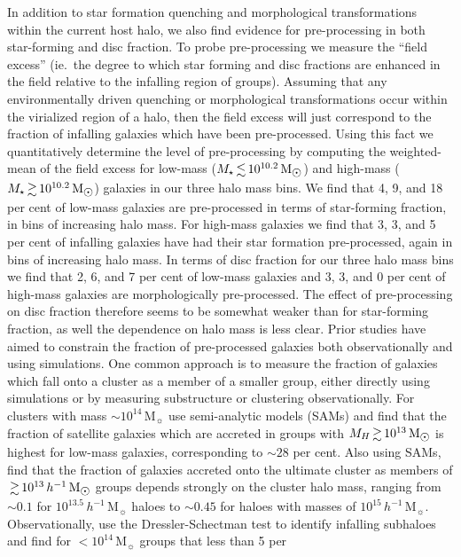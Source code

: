 \documentclass[a4paper,fleqn,usenatbib]{mnras}
\newcommand{\Msun}{\,\mathrm{M_{\sun}}}
\begin{document}
In addition to star formation quenching and morphological
transformations within the current host halo, we also find evidence
for pre-processing in both star-forming and disc fraction.  To probe
pre-processing we measure the ``field excess'' (ie.\ the degree to
which star forming and disc fractions are enhanced in the field
relative to the infalling region of groups).  Assuming that any
environmentally driven quenching or morphological transformations occur within the virialized region of a halo,
then the field excess will just correspond to the fraction of
infalling galaxies which have been pre-processed.  Using this fact we
quantitatively determine the level of pre-processing by computing the
weighted-mean of the field excess for low-mass ($M_\star \la
10^{10.2}\Msun$) and high-mass  ($M_\star \ga 10^{10.2}\Msun$)
galaxies in our three halo mass bins.
We find that 4, 9, and 18 per cent of low-mass galaxies are pre-processed
in terms of star-forming fraction, in bins of increasing halo mass.
For high-mass galaxies we find that 3,
3, and 5 per cent of infalling galaxies have had their star formation
pre-processed, again in bins of
increasing halo mass.  In terms of disc fraction for our three halo
mass bins we find that 2, 6,
and 7 per cent of low-mass galaxies and 3, 3, and 0 per cent of
high-mass galaxies are morphologically pre-processed.  The effect of
pre-processing on disc fraction therefore seems to be somewhat weaker than for
star-forming fraction, as well the dependence on halo mass is
less clear. 
Prior studies have aimed to constrain the
fraction of pre-processed galaxies both observationally and using
simulations.  One common approach is to measure the fraction of
galaxies which fall onto a cluster as a member of a smaller group,
either directly using simulations or by measuring substructure or
clustering observationally.  For clusters with mass $\sim
10^{14}\Msun$ \citet{delucia2012} use semi-analytic models (SAMs) and find
that the fraction of satellite galaxies which are accreted in groups
with $M_H \ga 10^{13}\Msun$ is highest for low-mass galaxies,
corresponding to $\sim 28$ per cent.  Also using SAMs,
\citet{mcgee2009} find that the fraction of galaxies accreted onto the
ultimate cluster as members of $\ga 10^{13}\,h^{-1}\Msun$ groups depends
strongly on the cluster halo mass, ranging from $\sim 0.1$ for
$10^{13.5}\,h^{-1}\Msun$ haloes to $\sim 0.45$ for haloes with masses
of $10^{15}\,h^{-1}\Msun$.  Observationally, \citet{hou2014} use the
Dressler-Schectman test \citep{dressler1988} to identify infalling
subhaloes and find for $<10^{14}\Msun$ groups that less than 5 per
\end{document}
